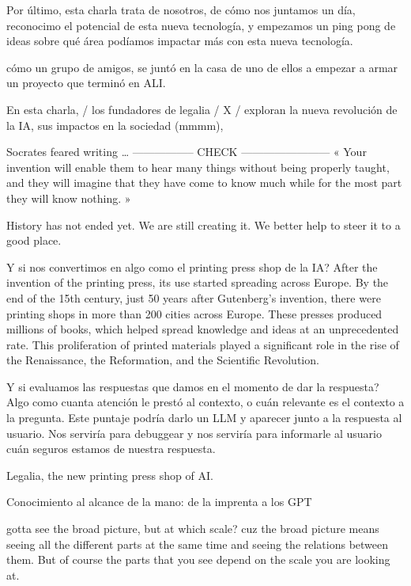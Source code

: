 Por último, esta charla trata de nosotros, de cómo nos juntamos un día, reconocimo el potencial de esta nueva tecnología, 
y empezamos un ping pong de ideas sobre qué área podíamos impactar más con esta nueva tecnología. 


cómo un grupo de amigos, se juntó en la casa de uno de ellos a empezar a armar un proyecto que terminó en ALI. 


En esta charla, / los fundadores de legalia / X / exploran la nueva revolución de la IA, sus impactos en la sociedad (mmmm), 



Socrates feared writing … ----------------- CHECK ------------------------
« Your invention will enable them to hear many things without being properly taught, and they will 
imagine that they have come to know much while for the most part they will know nothing. »






History has not ended yet. We are still creating it. We better help to steer it to a good place. 





Y si nos convertimos en algo como el printing press shop de la IA?
After the invention of the printing press, its use started spreading across Europe. By the end of the 15th century, 
just 50 years after Gutenberg's invention, there were printing shops in more than 200 cities across Europe. 
These presses produced millions of books, which helped spread knowledge and ideas at an unprecedented rate. 
This proliferation of printed materials played a significant role in the rise of the Renaissance, the Reformation, and the Scientific Revolution.


Y si evaluamos las respuestas que damos en el momento de dar la respuesta? Algo como cuanta atención le prestó al contexto, o cuán 
relevante es el contexto a la pregunta. Este puntaje podría darlo un LLM y aparecer junto a la respuesta al usuario. 
Nos serviría para debuggear y nos serviría para informarle al usuario cuán seguros estamos de nuestra respuesta. 


Legalia, the new printing press shop of AI. 





Conocimiento al alcance de la mano: de la imprenta a los GPT





gotta see the broad picture, but at which scale? cuz the broad picture means seeing all the different parts at the same time
and seeing the relations between them. But of course the parts that you see depend on the scale you are looking at. 